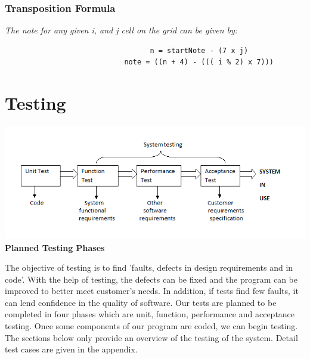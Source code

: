 \documentclass[10pt,a4paper]{article}
\begin{document}
\subsubsection{Transposition Formula}
\begin{center}
\textit{The note for any given i, and j cell on the grid can be given by:}\\

\begin{verbatim}
                                  n = startNote - (7 x j)  
                            note = ((n + 4) - ((( i % 2) x 7))) 
\end{verbatim}
\end{center}

\section{Testing}
\begin{center}
\includegraphics[scale=0.5]{9.png}\\
\textbf{Planned Testing Phases}\\
\end{center}
The objective of testing is to find 'faults, defects in design requirements and in code'\cite{SEP}. With the help of testing, the defects can be fixed and the program can be improved to better meet customer’s needs. In addition, if tests find few faults, it can lend confidence in the quality of software. Our tests are planned to be completed in four phases which are unit, function, performance and acceptance testing. Once some components of our program are coded, we can begin testing. The sections below only provide an overview of the testing of the system. Detail test cases are given in the appendix.
 
\end{document}

